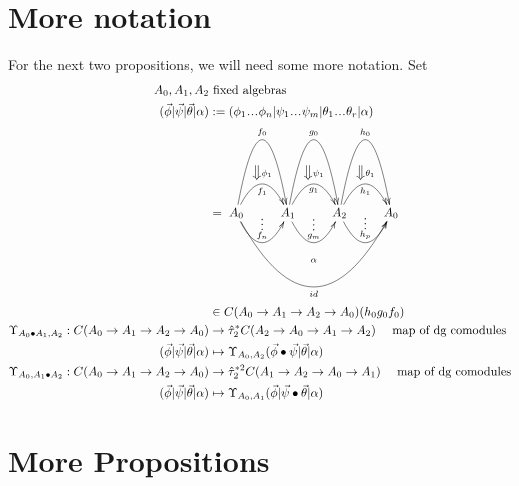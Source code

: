 \section{More notation}
For the next two propositions, we will need 
some more notation. Set
\begin{align*}
A_0, A_1, A_2
&\textrm{ fixed algebras}\\
(\vec{\phi} | \vec{\psi} | \vec{\theta}| \alpha) 
&:= 
(\phi_1\smdots\phi_n | \psi_1\smdots\psi_m| 
  \theta_1 \smdots \theta_r|\alpha)\\
&= 
\xymatrix{
A_0 \ar@/^5pc/[r]^{f_0} 
\ar@/^2pc/[r]^{\big\Downarrow \phi_1}_{f_1} 
\ar@/_2pc/[r]^{\substack{\vdots\\ f_n}}
\ar@/_5pc/[rrr]_{id}^{\substack{\alpha \\ \\ \\ \\ }}
& A_1 \ar@/^5pc/[r]^{g_0} 
\ar@/^2pc/[r]^{\big\Downarrow \psi_1}_{g_1} 
\ar@/_2pc/[r]^{\substack{\vdots\\ g_m}}
& A_2 \ar@/^5pc/[r]^{h_0} 
\ar@/^2pc/[r]^{\big\Downarrow \theta_1}_{h_1} 
\ar@/_2pc/[r]^{\substack{\vdots\\ h_p}}
& A_0
}\\
&\in 
C(A_0 \to A_1 \to A_2 \to A_0)(h_0g_0f_0)\\
\Upsilon_{A_0\bullet A_1, A_2}:
  C(A_0 \to A_1 \to A_2 \to A_0) 
&\to
\hat{\tau}_2^*C(A_2 \to A_0 \to A_1 \to A_2)
  \quad \textrm{ map of dg comodules}\\
(\vec{\phi} | \vec{\psi} | \vec{\theta}| \alpha) 
&\mapsto 
\Upsilon_{A_0,A_2}
  (\vec{\phi} \bullet \vec{\psi} | \vec{\theta}| \alpha)\\
\Upsilon_{A_0,A_1\bullet A_2}:
  C(A_0 \to A_1 \to A_2 \to A_0) 
&\to
\hat{\tau}_2^{*2}C(A_1 \to A_2 \to A_0 \to A_1)
  \quad \textrm{ map of dg comodules}\\
(\vec{\phi} | \vec{\psi} | \vec{\theta}| \alpha) 
&\mapsto 
\Upsilon_{A_0,A_1}
  (\vec{\phi}|\vec{\psi} \bullet \vec{\theta}| \alpha)\\
\end{align*}

\section{More Propositions}

